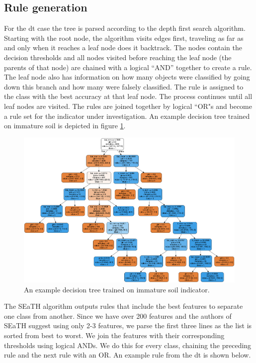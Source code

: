 \documentclass[authoryear,preprint,12pt,number]{elsarticle}
\begin{document}
\subsection{Rule generation}
For the \gls{dt} case the tree is parsed according to the depth first search 
algorithm. Starting with the root node, the algorithm visits edges first, 
traveling as far as and only when it reaches a leaf node does it backtrack. The 
nodes contain the decision thresholds and all nodes visited before reaching the 
leaf node (the parents of that node) are chained with a logical ``AND'' 
together to create a rule. The leaf node also has information on how many 
objects were classified by going down this branch and how many were falsely 
classified. The rule is assigned to the class with the best accuracy at that 
leaf node. The process continues until all leaf nodes are visited. The rules 
are joined together by logical ``OR"s and become a rule set for the indicator 
under investigation. An example decision tree trained on immature soil is 
depicted in figure \ref{fig:decisiontree}.
\begin{figure}
\includegraphics[width=\textwidth]{diagrams/natfo_immature_soil_dt.png}
    \caption{An example decision tree trained on immature soil 
indicator.\label{fig:decisiontree}}
\end{figure}
The SEaTH algorithm outputs rules that include the best features to separate 
one class from another. Since we have over 200 features and the authors of 
SEaTH suggest using only 2-3 features, we parse the first three lines as the 
list is sorted from best to worst. We join the features with their 
corresponding thresholds using logical ANDs. We do this for every class, 
chaining the preceding rule and the next rule with an OR. An example rule from 
the \gls{dt} is shown below.
\end{document}
